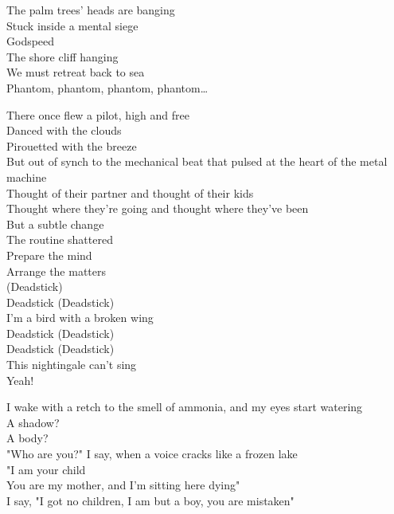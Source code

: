 The palm trees' heads are banging \\
Stuck inside a mental siege \\
Godspeed \\
The shore cliff hanging \\
We must retreat back to sea \\

Phantom, phantom, phantom, phantom… \\




There once flew a pilot, high and free \\
Danced with the clouds \\
Pirouetted with the breeze \\
But out of synch to the mechanical beat that pulsed at the heart of the metal machine \\
Thought of their partner and thought of their kids \\
Thought where they're going and thought where they've been \\
But a subtle change \\
The routine shattered \\
Prepare the mind \\
Arrange the matters \\

 (Deadstick) \\
Deadstick (Deadstick) \\
I'm a bird with a broken wing \\
Deadstick (Deadstick) \\
Deadstick (Deadstick) \\
This nightingale can't sing \\
Yeah! \\


I wake with a retch to the smell of ammonia, and my eyes start watering \\
A shadow? \\
A body? \\
"Who are you?" I say, when a voice cracks like a frozen lake \\
"I am your child \\
You are my mother, and I'm sitting here dying" \\
I say, "I got no children, I am but a boy, you are mistaken" \\

